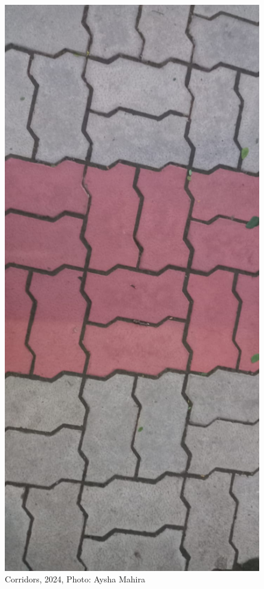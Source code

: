 \documentclass{beamer}
\begin{document}
\begin{frame}
\begin{figure}
        \includegraphics[height=0.5\textheight]{corridor3}
        \caption{Corridors, 2024, Photo: Aysha Mahira}
    \end{figure}
\end{frame}
\end{document}
